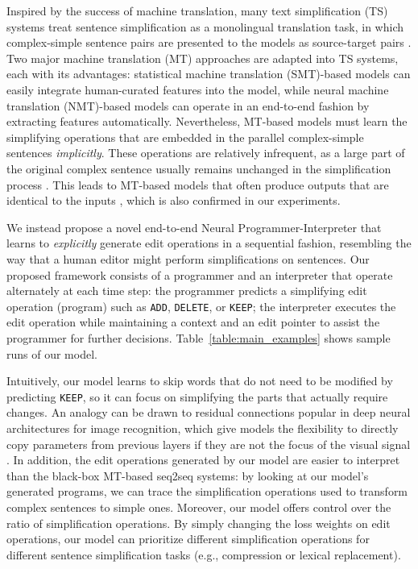 \documentclass[11pt,a4paper]{article}
\def\add{{\texttt{ADD}}}
\def\delete{{\texttt{DELETE}}}
\def\keep{{\texttt{KEEP}}}
\begin{document}
Inspired by the success of machine translation, many text simplification (TS) systems treat sentence simplification as a monolingual translation task, in which complex-simple sentence pairs are presented to the models as source-target pairs \citep{zhang2017sentence}. Two major machine translation (MT) approaches are adapted into TS systems, each with its advantages:  statistical machine translation (SMT)-based models \citep{zhu2010monolingual,wubben2012sentence,narayan2014hybrid,xu2016optimizing} can easily integrate human-curated features into the model, while neural machine translation (NMT)-based models \citep{nisioi2017exploring,zhang2017sentence,vu2018sentence} can operate in an end-to-end fashion by extracting features automatically. Nevertheless, MT-based models must learn the simplifying operations that are embedded in the parallel complex-simple sentences \emph{implicitly}. These operations are relatively infrequent, as a large part of the original complex sentence usually remains unchanged in the simplification process
\citep{zhang2017constrained}. This leads to MT-based models that often produce outputs that are identical to the inputs \citep{zhao2018integrating}, which is also confirmed in our experiments. 

We instead propose a novel end-to-end Neural Programmer-Interpreter \citep{reed2016neural} that learns to \emph{explicitly} generate edit operations in a sequential fashion, resembling the way that a human editor might perform simplifications on sentences. Our proposed framework consists of  a programmer and an interpreter that operate alternately at each time step: the programmer predicts a simplifying edit operation (program) such as \add, \delete, or \keep; the interpreter executes the edit operation  while maintaining a context and an edit pointer to assist the programmer for further decisions. Table~\ref{table:main_examples} shows sample runs of our model. 

Intuitively, our model learns to skip words that do not need to be modified by predicting \keep, so it can focus on simplifying the parts that actually require changes. An analogy can be drawn to residual connections popular in deep neural architectures for image recognition, which give  models the flexibility to directly copy parameters from previous layers if they are not the focus of the visual signal \citep{he2016deep}. In addition, the edit operations generated by our model are easier to interpret than the black-box MT-based seq2seq systems: by looking at our model's generated programs, we can trace the simplification operations used to transform complex sentences to simple ones. Moreover, our model offers control over the ratio of simplification operations. By simply changing the loss weights on edit operations, our model can prioritize different simplification operations for different sentence simplification tasks (e.g., compression or lexical replacement). 
\end{document}
